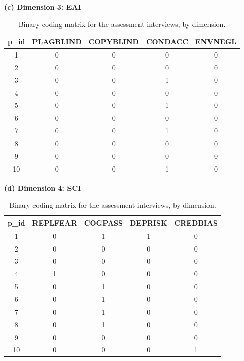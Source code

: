 \begin{table}
\vspace{1.5em}

\begin{minipage}[t]{0.48\textwidth}
\centering
\small
\textbf{(c) Dimension 3: EAI}

\vspace{0.4em}

\begin{tabular}{ccccc}
\hline
p\_id & PLAGBLIND & COPYBLIND & CONDACC & ENVNEGL \\
\hline
1  & 0 & 0 & 0 & 0 \\
2  & 0 & 0 & 0 & 0 \\
3  & 0 & 0 & 1 & 0 \\
4  & 0 & 0 & 0 & 0 \\
5  & 0 & 0 & 1 & 0 \\
6  & 0 & 0 & 0 & 0 \\
7  & 0 & 0 & 1 & 0 \\
8  & 0 & 0 & 0 & 0 \\
9  & 0 & 0 & 0 & 0 \\
10 & 0 & 0 & 1 & 0 \\
\hline
\end{tabular}
\end{minipage}
\hfill
\begin{minipage}[t]{0.48\textwidth}
\centering
\small
\textbf{(d) Dimension 4: SCI}

\vspace{0.4em}

\begin{tabular}{ccccc}
\hline
p\_id & REPLFEAR & COGPASS & DEPRISK & CREDBIAS \\
\hline
1  & 0 & 1 & 1 & 0 \\
2  & 0 & 0 & 0 & 0 \\
3  & 0 & 0 & 0 & 0 \\
4  & 1 & 0 & 0 & 0 \\
5  & 0 & 1 & 0 & 0 \\
6  & 0 & 1 & 0 & 0 \\
7  & 0 & 1 & 0 & 0 \\
8  & 0 & 1 & 0 & 0 \\
9  & 0 & 0 & 0 & 0 \\
10 & 0 & 0 & 0 & 1 \\
\hline
\end{tabular}
\end{minipage}

\caption{Binary coding matrix for the assessment interviews, by dimension.}
\label{final_coding_ass}
\end{table}

